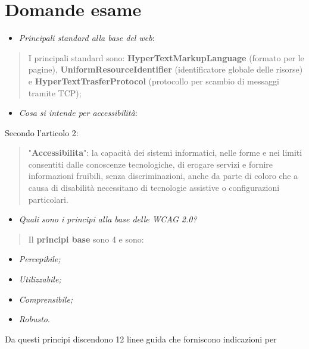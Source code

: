 \section{Domande esame}\label{domande-esame}

\begin{itemize}
\item
  \emph{Principali standard alla base del web}:
\end{itemize}

\begin{quote}
I principali standard sono: \textbf{HyperTextMarkupLanguage} (formato
per le pagine), \textbf{UniformResourceIdentifier} (identificatore
globale delle risorse) e \textbf{HyperTextTrasferProtocol} (protocollo
per scambio di messaggi tramite TCP);
\end{quote}

\begin{itemize}
\item
  \emph{Cosa si intende per accessibilità}:
\end{itemize}

Secondo l'articolo 2:

\begin{quote}
"\textbf{Accessibilita}\textquotesingle": la capacità dei sistemi
informatici, nelle forme e nei limiti consentiti dalle conoscenze
tecnologiche, di erogare servizi e fornire informazioni fruibili, senza
discriminazioni, anche da parte di coloro che a causa di disabilità
necessitano di tecnologie assistive o configurazioni particolari.
\end{quote}

\begin{itemize}
\item
  \emph{Quali sono i principi alla base delle WCAG 2.0?}
\end{itemize}

\begin{quote}
Il \textbf{principi base} sono 4 e sono:
\end{quote}

\begin{itemize}
\item
  \emph{Percepibile;}
\item
  \emph{Utilizzabile;}
\item
  \emph{Comprensibile;}
\item
  \emph{Robusto}.
\end{itemize}

Da questi principi discendono 12 linee guida che forniscono indicazioni
per


